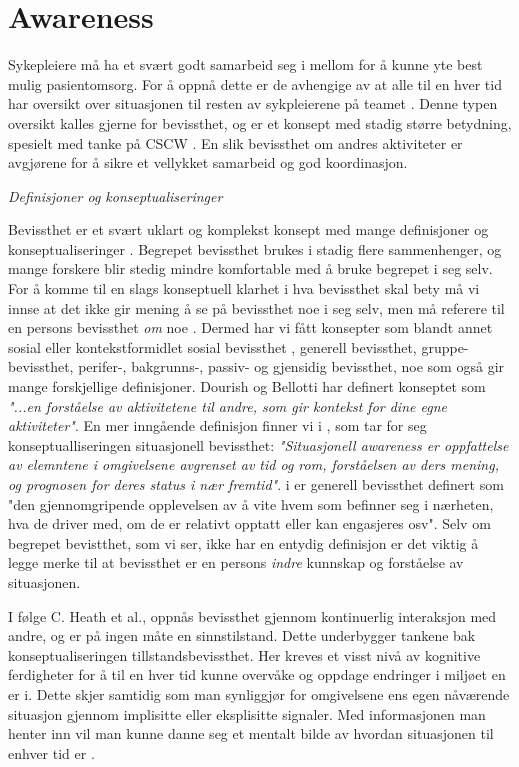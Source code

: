 \section{Awareness}
\label{chp: awareness}

Sykepleiere må ha et svært godt samarbeid seg i mellom for å kunne yte best mulig pasientomsorg. For å oppnå dette er de avhengige av at alle til en hver tid har oversikt over situasjonen til resten av sykpleierene på teamet \cite{Evjemo}. Denne typen oversikt kalles gjerne for bevissthet, og er et konsept med stadig større betydning, spesielt med tanke på CSCW \cite{Dourish92}. En slik bevissthet om andres aktiviteter er avgjørene for å sikre et vellykket samarbeid og god koordinasjon\cite{KlemetsRedundancy}. 

\noindent
\emph{Definisjoner og konseptualiseringer}

\noindent
Bevissthet er et svært uklart og komplekst konsept med mange definisjoner og konseptualiseringer \cite{KlemetsRedundancy}\cite{Gutwin04}\cite{Schmidt02}. Begrepet bevissthet brukes i stadig flere sammenhenger, og mange forskere blir stedig mindre komfortable med å bruke begrepet i seg selv. For å komme til en slags konseptuell klarhet i hva bevissthet skal bety må vi innse at det ikke gir mening å se på bevissthet noe i seg selv, men må referere til en persons bevissthet \emph{om} noe \cite{Schmidt02}. Dermed har vi fått konsepter som blandt annet sosial eller kontekstformidlet sosial bevissthet \cite{Bardram04}, generell bevissthet\cite{Gross13}, gruppe-bevissthet\cite{Gutwin04}, perifer-, bakgrunns-, passiv- og gjensidig bevissthet\cite{Schmidt02}, noe som også gir mange forskjellige definisjoner. Dourish og Bellotti har definert konseptet som \emph{"...en forståelse av aktivitetene til andre, som gir kontekst for dine egne aktiviteter"}. En mer inngående definisjon finner vi i \cite{Endsly95}, som tar for seg konseptualliseringen situasjonell bevissthet: \emph{"Situasjonell awareness er oppfattelse av elemntene i omgivelsene avgrenset av tid og rom, forståelsen av ders mening, og prognosen for deres status i nær fremtid"}. i \cite{Gross13} er generell bevissthet definert som "den gjennomgripende opplevelsen av å vite hvem som befinner seg i nærheten, hva de driver med, om de er relativt opptatt eller kan engasjeres osv". Selv om begrepet bevistthet, som vi ser, ikke har en entydig definisjon er det viktig å legge merke til at bevissthet er en persons \emph{indre} kunnskap og forståelse av situasjonen.\cite{Gross13} 

\noindent
I følge C. Heath et al., oppnås bevissthet gjennom kontinuerlig interaksjon med andre, og er på ingen måte en sinnstilstand. Dette underbygger tankene bak konseptualiseringen tillstandsbevissthet. Her kreves et visst nivå av kognitive ferdigheter for å til en hver tid kunne overvåke og oppdage endringer i miljøet en er i. Dette skjer samtidig som man synliggjør for omgivelsene ens egen nåværende situasjon gjennom implisitte eller eksplisitte signaler. Med informasjonen man henter inn vil man kunne danne seg et mentalt bilde av hvordan situasjonen til enhver tid er \cite{Bardram04}. 
